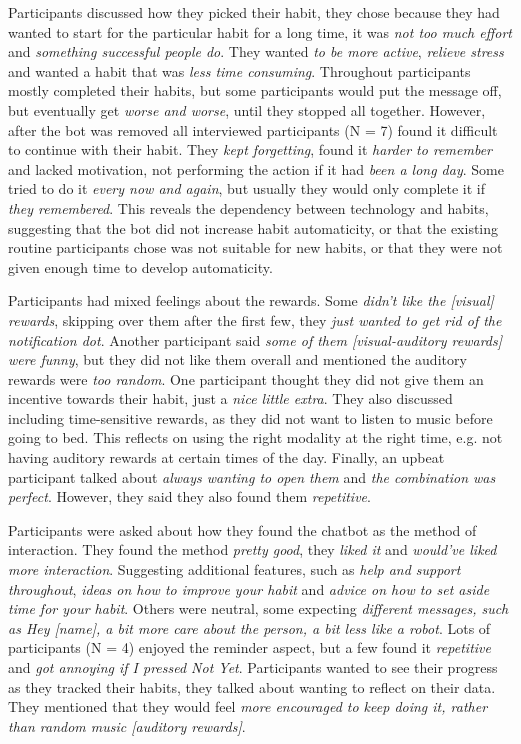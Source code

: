 \documentclass{scaffold/sigchi}
\begin{document}
Participants discussed how they picked their habit, they chose because they had wanted to start for the particular habit for a long time, it was \textit{not too much effort} and \textit{something successful people do}. They wanted \textit{to be more active}, \textit{relieve stress} and wanted a habit that was \textit{less time consuming}. Throughout participants mostly completed their habits, but some participants would put the message off, but eventually get \textit{worse and worse}, until they stopped all together. However, after the bot was removed all interviewed participants (N = 7) found it difficult to continue with their habit. They \textit{kept forgetting}, found it \textit{harder to remember} and lacked motivation, not performing the action if it had \textit{been a long day}. Some tried to do it \textit{every now and again}, but usually they would only complete it if \textit{they remembered}. This reveals the dependency between technology and habits, suggesting that the bot did not increase habit automaticity, or that the existing routine participants chose was not suitable for new habits, or that they were not given enough time to develop automaticity.


Participants had mixed feelings about the rewards. Some \textit{didn't like the [visual] rewards}, skipping over them after the first few, they \textit{just wanted to get rid of the notification dot}. Another participant said \textit{some of them [visual-auditory rewards] were funny}, but they did not like them overall and mentioned the auditory rewards were \textit{too random}. One participant thought they did not give them an incentive towards their habit, just a \textit{nice little extra}. They also discussed including time-sensitive rewards, as they did not want to listen to music before going to bed. This reflects on using the right modality at the right time, e.g. not having auditory rewards at certain times of the day. Finally, an upbeat participant talked about \textit{always wanting to open them} and \textit{the combination was perfect}. However, they said they also found them \textit{repetitive}.


Participants were asked about how they found the chatbot as the method of interaction. They found the method \textit{pretty good}, they \textit{liked it} and \textit{would've liked more interaction}. Suggesting additional features, such as \textit{help and support throughout}, \textit{ideas on how to improve your habit} and \textit{advice on how to set aside time for your habit}. Others were neutral, some expecting \textit{different messages, such as Hey [name], a bit more care about the person, a bit less like a robot}. Lots of participants (N = 4) enjoyed the reminder aspect, but a few found it \textit{repetitive} and \textit{got annoying if I pressed Not Yet}. Participants wanted to see their progress as they tracked their habits, they talked about wanting to reflect on their data. They mentioned that they would feel \textit{more encouraged to keep doing it, rather than random music [auditory rewards]}.
\end{document}
